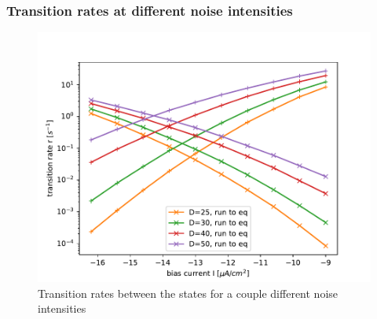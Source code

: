 \documentclass[12pt,a4paper]{article}
\begin{document}
\subsubsection{Transition rates at different noise intensities}
\begin{figure}[H]
	\centering
	\includegraphics[scale=1]{tranratesrinzel.pdf}\caption{Transition rates between the states for a couple different noise intensities}
	\label{tranratesrinzel}
\end{figure}
\end{document}
